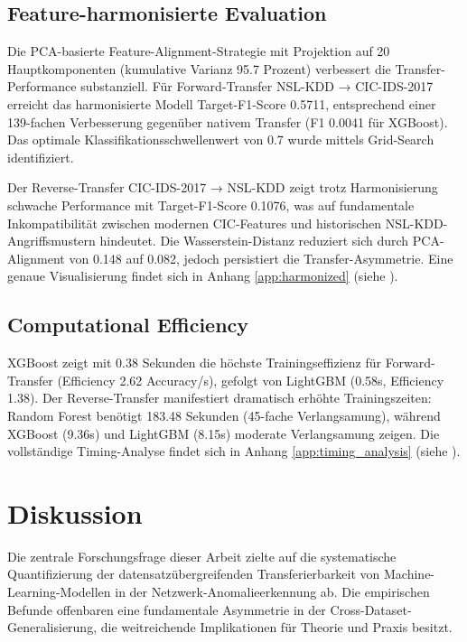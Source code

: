 \documentclass[11pt,a4paper]{article}
\begin{document}
    \subsection{Feature-harmonisierte Evaluation}

    Die PCA-basierte Feature-Alignment-Strategie mit Projektion auf 20 Hauptkomponenten (kumulative Varianz 95.7 Prozent) verbessert die Transfer-Performance substanziell. Für Forward-Transfer NSL-KDD → CIC-IDS-2017 erreicht das harmonisierte Modell Target-F1-Score 0.5711, entsprechend einer 139-fachen Verbesserung gegenüber nativem Transfer (F1 0.0041 für XGBoost). Das optimale Klassifikationsschwellenwert von 0.7 wurde mittels Grid-Search identifiziert.

    Der Reverse-Transfer CIC-IDS-2017 → NSL-KDD zeigt trotz Harmonisierung schwache Performance mit Target-F1-Score 0.1076, was auf fundamentale Inkompatibilität zwischen modernen CIC-Features und historischen NSL-KDD-Angriffsmustern hindeutet. Die Wasserstein-Distanz reduziert sich durch PCA-Alignment von 0.148 auf 0.082, jedoch persistiert die Transfer-Asymmetrie. Eine genaue Visualisierung findet sich in Anhang \ref{app:harmonized} (siehe \parencite{Weirauch2025}).

    \subsection{Computational Efficiency}

    XGBoost zeigt mit 0.38 Sekunden die höchste Trainingseffizienz für Forward-Transfer (Efficiency 2.62 Accuracy/s), gefolgt von LightGBM (0.58s, Efficiency 1.38). Der Reverse-Transfer manifestiert dramatisch erhöhte Trainingszeiten: Random Forest benötigt 183.48 Sekunden (45-fache Verlangsamung), während XGBoost (9.36s) und LightGBM (8.15s) moderate Verlangsamung zeigen. Die vollständige Timing-Analyse findet sich in Anhang \ref{app:timing_analysis} (siehe \parencite{Weirauch2025}).

    \section{Diskussion}

    Die zentrale Forschungsfrage dieser Arbeit zielte auf die systematische Quantifizierung der datensatzübergreifenden Transferierbarkeit von Machine-Learning-Modellen in der Netzwerk-Anomalieerkennung ab. Die empirischen Befunde offenbaren eine fundamentale Asymmetrie in der Cross-Dataset-Generalisierung, die weitreichende Implikationen für Theorie und Praxis besitzt.
\end{document}
